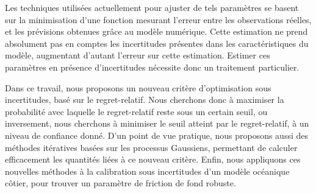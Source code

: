 Les techniques utilisées actuellement
pour ajuster de tels paramètres se basent sur la minimisation d'une
fonction mesurant l'erreur entre les observations réelles, et les
prévisions obtenues grâce au modèle numérique. Cette estimation ne
prend absolument pas en comptes les incertitudes présentes dans les
caractéristiques du modèle, augmentant d'autant l'erreur sur cette
estimation. Estimer ces paramètres en présence d'incertitudes
nécessite donc un traitement particulier.

Dans ce travail, nous proposons un nouveau critère d'optimisation sous
incertitudes, basé sur le regret-relatif. Nous cherchons donc à
maximiser la probabilité avec laquelle le regret-relatif reste sous un
certain seuil, ou inversement, nous cherchons à minimiser le seuil
atteint par le regret-relatif, à un niveau de confiance donné.  D'un
point de vue pratique, nous proposons aussi des méthodes itératives
basées sur les processus Gaussiens, permettant de calculer
efficacement les quantités liées à ce nouveau critère.  Enfin, nous
appliquons ces nouvelles méthodes à la calibration sous incertitudes
d'un modèle océanique côtier, pour trouver un paramètre de friction de
fond robuste.
\vfill